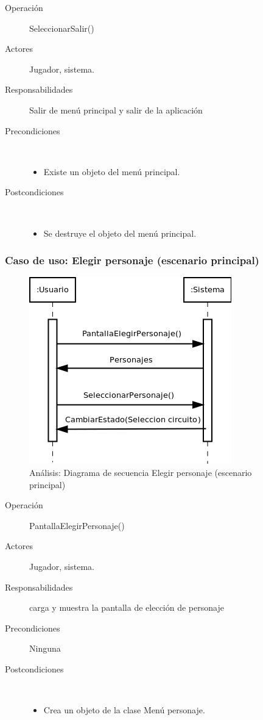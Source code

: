 \begin{description}
    \item [Operación] SeleccionarSalir()
    \item [Actores] Jugador, sistema.
    \item [Responsabilidades] Salir de menú principal y salir de la aplicación
    \item [Precondiciones] $\quad$
        \begin{itemize}
            \item Existe un objeto del menú principal.
        \end{itemize}
    \item [Postcondiciones] $\quad$
        \begin{itemize}
            \item Se destruye el objeto del menú principal.
        \end{itemize}
\end{description}

\subsubsection{Caso de uso: Elegir personaje (escenario principal)}

\begin{figure}[H] 
  \label{secuencia_elegir_personaje}
  \begin{center}
    \includegraphics[scale=0.7]{imagenes/analisis/secuencia_elegir_personaje1.png}
  \end{center}
  \caption{Análisis: Diagrama de secuencia Elegir personaje (escenario principal)}
\end{figure}

\begin{description}
    \item [Operación] PantallaElegirPersonaje()
    \item [Actores] Jugador, sistema.
    \item [Responsabilidades] carga y muestra la pantalla de elección de personaje
    \item [Precondiciones] Ninguna
    \item [Postcondiciones] $\quad$
        \begin{itemize}
            \item Crea un objeto de la clase Menú personaje.
        \end{itemize}
\end{description}

